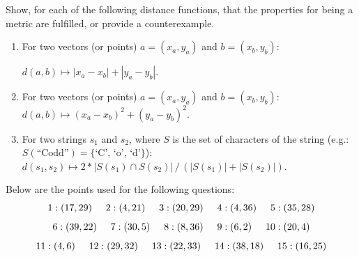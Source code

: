 Show, for each of the following distance functions, that the properties for being a metric are fulfilled, or provide a counterexample.

    \begin{enumerate}

   \item\label{l1} 
   For two vectors (or points) $a=(x_a, y_a)$ and $b=(x_b, y_b)$:

 $d(a, b) \mapsto | x_a - x_b | + | y_a - y_b |$.  

  \item\label{l2} 
For two vectors (or points) $a=(x_a, y_a)$ and $b=(x_b, y_b)$:
 $d(a, b) \mapsto ( x_a - x_b )^2 + ( y_a - y_b )^2$.

      \item\label{l3} 
      For two strings $s_1$ and $s_2$, where $S$ is the set of characters of the string (e.g.: $S(\text{``Codd''}) = \{\text{`C', `o', `d'}\}$):
      $d(s_1, s_2) \mapsto 2* |S(s_1) \cap S(s_2)| \, / \, (|S(s_1)| + |S(s_2)|)$.\\

    \end{enumerate}

\newpage
{}

  Below are the points used for the following questions:
\[
1: (17, 29) \hspace{5mm}
2: (4, 21) \hspace{5mm}
3: (20, 29) \hspace{5mm}
4: (4, 36) \hspace{5mm}
5: (35, 28)
\]
\[
6: (39, 22) \hspace{5mm}
7: (30, 5) \hspace{5mm}
8: (8, 36) \hspace{5mm}
9: (6, 2) \hspace{5mm}
10: (20, 4)
\]
\[
11: (4, 6) \hspace{5mm}
12: (29, 32) \hspace{5mm}
13: (22, 33) \hspace{5mm}
14: (38, 18) \hspace{5mm}
15: (16, 25)
\]

